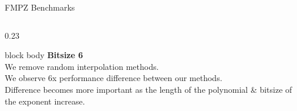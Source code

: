 \documentclass[aspectratio=169]{beamer}
\begin{document}
\begin{frame}{FMPZ Benchmarks}
{\begin{columns}[T,onlytextwidth]
  \begin{column}{0.23\textwidth}
    \footnotesize
    \begin{beamercolorbox}[
      rounded=true,
      shadow=false,
      sep=0.7em,
      wd=\linewidth
    ]{block body}
      \textbf{Bitsize 6} \\
      \vspace{0.6em}
      We remove random interpolation methods.\\
      \vspace{0.4em}
      We observe 6x performance difference between our methods. \\
      \vspace{0.4em}
      Difference becomes more important as the length of the polynomial \& bitsize of the exponent increase.
    \end{beamercolorbox}
  \end{column}
\end{columns}
}
\end{frame}
\end{document}
